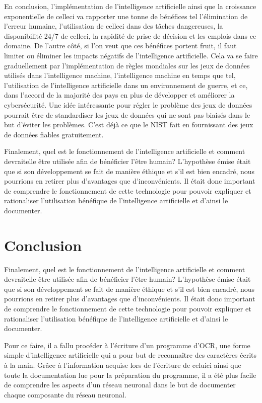 \documentclass[letterpaper,10pt,french]{sphinxmanual}
\begin{document}
En conclusion, l’implémentation de l’intelligence artificielle ainsi que la croissance
exponentielle de celle\sphinxhyphen{}ci va rapporter une tonne de bénéfices tel l’élimination de l’erreur humaine,
l’utilisation de celle\sphinxhyphen{}ci dans des tâches dangereuses, la disponibilité 24/7 de celle\sphinxhyphen{}ci,
la rapidité de prise de décision et les emplois dans ce domaine. De l’autre côté, si l’on veut
que ces bénéfices portent fruit, il faut limiter ou éliminer les impacts négatifs de l’intelligence
artificielle. Cela va se faire graduellement par l’implémentation de règles mondiales sur les jeux
de données utilisés dans l’intelligence machine, l’intelligence machine en temps que tel, l’utilisation
de l’intelligence artificielle dans un environnement de guerre, et ce, dans l’accord de la majorité
des pays en plus de développer et améliorer la cybersécurité. Une idée intéressante pour régler le
problème des jeux de données pourrait être de standardiser les jeux de données qui ne sont pas biaisés
dans le but d’éviter les problèmes. C’est déjà ce que le NIST fait en fournissant des jeux de données
fiables gratuitement.

Finalement, quel est le fonctionnement de l’intelligence artificielle et comment devrait\sphinxhyphen{}elle être utilisée
afin de bénéficier l’être humain? L’hypothèse émise était que si son développement se fait de manière
éthique et s’il est bien encadré, nous pourrions en retirer plus d’avantages que d’inconvénients. Il
était donc important de comprendre le fonctionnement de cette technologie pour pouvoir expliquer et
rationaliser l’utilisation bénéfique de l’intelligence artificielle et d’ainsi le documenter.


\section{Conclusion}
\label{\detokenize{conclusion:conclusion}}\label{\detokenize{conclusion::doc}}
Finalement, quel est le fonctionnement de l’intelligence artificielle et
comment devrait\sphinxhyphen{}elle être utilisée afin de bénéficier l’être humain?
L’hypothèse émise était que si son développement se fait de manière éthique
et s’il est bien encadré, nous pourrions en retirer plus d’avantages que
d’inconvénients. Il était donc important de comprendre le fonctionnement
de cette technologie pour pouvoir expliquer et rationaliser l’utilisation
bénéfique de l’intelligence artificielle et d’ainsi le documenter.

Pour ce faire, il a fallu procéder à l’écriture d’un programme d’OCR, une
forme simple d’intelligence artificielle qui a pour but de reconnaître des
caractères écrits à la main. Grâce à l’information acquise lors de l’écriture
de celui\sphinxhyphen{}ci ainsi que toute la documentation lue pour la préparation du
programme, il a été plus facile de comprendre les aspects d’un réseau neuronal
dans le but de documenter chaque composante du réseau neuronal.
\end{document}
